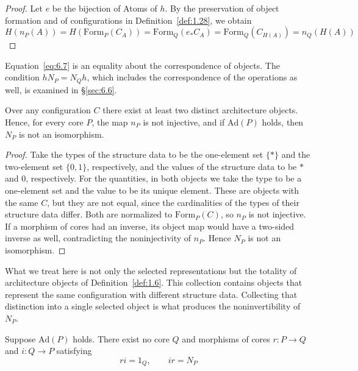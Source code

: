 \begin{proof}

Let $e$ be the bijection of Atoms of $h$. By the preservation of object formation and of
configurations in Definition~\ref{def:1.28}, we obtain
\[
H(n_P(A))
=H(\mathrm{Form}_P(C_A))
=\mathrm{Form}_Q(e_*C_A)
=\mathrm{Form}_Q(C_{H(A)})
=n_Q(H(A))
\]

\end{proof}

Equation~\eqref{eq:6.7} is an equality about the correspondence of objects.
The condition $hN_P=N_Qh$, which includes the correspondence of the operations as well, is examined in \S\ref{sec:6.6}.

\begin{proposition}\label{prop:6.7}

Over any configuration $C$ there exist at least two distinct architecture objects.
Hence, for every core $P$, the map $n_P$ is not injective, and if $\mathrm{Ad}(P)$ holds,
then $N_P$ is not an isomorphism.

\end{proposition}

\begin{proof}

Take the types of the structure data to be the one-element set $\{*\}$ and the two-element
set $\{0,1\}$, respectively, and the values of the structure data to be $*$ and $0$,
respectively.
For the quantities, in both objects we take the type to be a one-element set and the value
to be its unique element.
These are objects with the same $C$, but they are not equal, since the cardinalities of the
types of their structure data differ.
Both are normalized to $\mathrm{Form}_P(C)$, so $n_P$ is not injective.
If a morphism of cores had an inverse, its object map would have a two-sided inverse as
well, contradicting the noninjectivity of $n_P$. Hence $N_P$ is not an isomorphism.

\end{proof}

What we treat here is not only the selected representations but the totality of
architecture objects of Definition~\ref{def:1.6}.
This collection contains objects that represent the same configuration with different
structure data.
Collecting that distinction into a single selected object is what produces the
noninvertibility of $N_P$.

\begin{theorem}\label{thm:6.8}

Suppose $\mathrm{Ad}(P)$ holds.
There exist no core $Q$ and morphisms of cores $r:P\to Q$ and $i:Q\to P$ satisfying
\begin{equation*}
ri=1_Q,\qquad ir=N_P
\tag{6.8}\label{eq:6.8}
\end{equation*}

\end{theorem}

